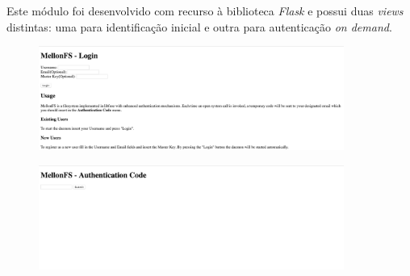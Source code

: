\documentclass{article}
\begin{document}
Este módulo foi desenvolvido com recurso à biblioteca \textit{Flask} e possui duas \textit{views} distintas: uma para identificação inicial e outra para 
autenticação \textit{on demand}.

\begin{figure}[H]
    \centering
    \includegraphics[width=10cm]{Pictures/Main.png}
\end{figure}

\begin{figure}
    \centering
    \includegraphics[width=10cm]{Pictures/Auth.png}
\end{figure}
\end{document}
